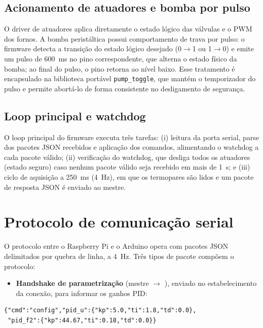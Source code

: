 \subsection{Acionamento de atuadores e bomba por pulso}

O driver de atuadores aplica diretamente o estado l\'ogico das v\'alvulas e o
PWM dos fornos. A bomba perist\'altica possui comportamento de trava por pulso:
o firmware detecta a transi\c{c}\~ao do estado l\'ogico desejado (0$\to$1 ou
1$\to$0) e emite um pulso de $600$~ms no pino correspondente, que alterna o
estado f\'isico da bomba; ao final do pulso, o pino retorna ao n\'ivel baixo.
Esse tratamento \'e encapsulado na biblioteca port\'avel \texttt{pump\_toggle},
que mant\'em o temporizador do pulso e permite abort\'a-lo de forma consistente
no desligamento de seguran\c{c}a.

\subsection{Loop principal e watchdog}

O loop principal do firmware executa tr\^es tarefas: (i) leitura da porta
serial, parse dos pacotes JSON recebidos e aplica\c{c}\~ao dos comandos,
alimentando o watchdog a cada pacote v\'alido; (ii) verifica\c{c}\~ao do
watchdog, que desliga todos os atuadores (estado seguro) caso nenhum pacote
v\'alido seja recebido em mais de 1~s; e (iii) ciclo de aquisi\c{c}\~ao a
250~ms (4~Hz), em que os termopares s\~ao lidos e um pacote de resposta JSON \'e
enviado ao mestre.

\section{Protocolo de comunica\c{c}\~ao serial}

O protocolo entre o Raspberry Pi e o Arduino opera com pacotes JSON delimitados
por quebra de linha, a 4~Hz. Tr\^es tipos de pacote comp\~oem o protocolo:

\begin{itemize}
  \item \textbf{Handshake de parametriza\c{c}\~ao} (mestre $\to$ \daq), enviado
  no estabelecimento da conex\~ao, para informar os ganhos PID:
\end{itemize}
\begin{verbatim}
{"cmd":"config","pid_u":{"kp":5.0,"ti":1.8,"td":0.0},
 "pid_f2":{"kp":44.67,"ti":0.18,"td":0.0}}
\end{verbatim}

